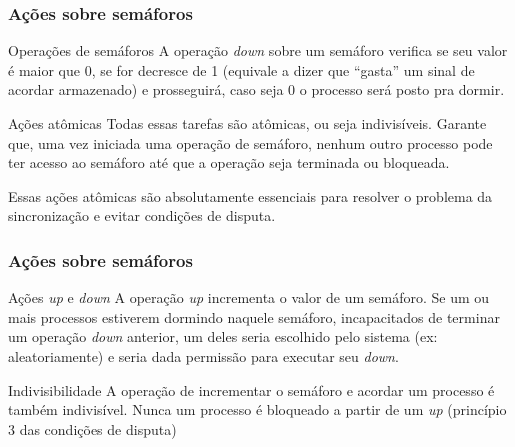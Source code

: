 \documentclass[11pt]{beamer}
\begin{document}
\begin{frame}\frametitle{ Ações sobre semáforos}

\begin{block}{ Operações de semáforos}
  A operação \textit{down} sobre um semáforo verifica se seu valor é maior que 0, se for decresce de 1 
  (equivale a dizer que ``gasta'' um sinal de acordar armazenado) e prosseguirá, caso seja 0 o processo será posto pra dormir.
\end{block}

\pause
\begin{block}{ Ações atômicas}
  Todas essas tarefas são atômicas, ou seja indivisíveis. Garante que, uma vez iniciada uma operação de semáforo, nenhum 
  outro processo pode ter acesso ao semáforo até que a operação seja terminada ou bloqueada.
\end{block}

\pause
  Essas ações atômicas são absolutamente essenciais para resolver o problema da sincronização e evitar condições de disputa.

\end{frame}


\begin{frame}\frametitle{ Ações sobre semáforos}

\begin{block}{ Ações \textit{up} e \textit{down}}
  A operação \textit{up} incrementa o valor de um semáforo. Se um ou mais processos estiverem dormindo naquele semáforo, 
  incapacitados de terminar um operação \textit{down} anterior, um deles seria escolhido pelo sistema (ex: aleatoriamente) 
  e seria dada permissão para executar seu \textit{down}.
\end{block}

\pause
\begin{block}{ Indivisibilidade}
  A operação de incrementar o semáforo e acordar um processo é também indivisível. 
  Nunca um processo é bloqueado a partir de um \textit{up} (princípio 3 das condições de disputa)
\end{block}
\end{frame}


\end{document}
